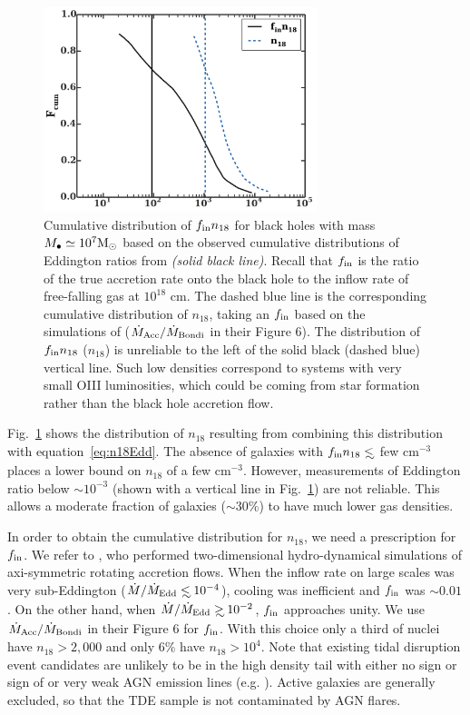 \documentclass[usenatbib,fleqn]{mnras}
\newcommand\lsim{\mathrel{\rlap{\lower4pt\hbox{\hskip1pt$\sim$}}
    \raise1pt\hbox{$<$}}}
\newcommand\gsim{\mathrel{\rlap{\lower4pt\hbox{\hskip1pt$\sim$}}
    \raise1pt\hbox{$>$}}}
\newcommand{\Mbh}[1][]{M_{\bullet#1}}
\newcommand{\Msun}{{\rm M_\odot}}
\begin{document}
\begin{figure}
\includegraphics[width=8cm]{fcum_n18.pdf}
\caption{\label{fig:n18Cum} Cumulative distribution of $f_{\rm in}
  n_{18}$ for black holes with mass $\Mbh\simeq 10^{7} \Msun$ based on
  the observed cumulative distributions of Eddington ratios from
  \citet{Kauffmann&Heckman2009} {\it (solid black line)}. Recall that
  $f_{\rm in}$ is the ratio of the true accretion rate onto the black
  hole to the inflow rate of free-falling gas at $10^{18}$ cm.  The
  dashed blue line is the corresponding cumulative distribution of
  $n_{18}$, taking an $f_{\rm in}$ based on the simulations of
  \citet{Li+2013} ($\dot{M}_{\rm Acc}/\dot{M}_{\rm Bondi}$ in their
  Figure 6). The distribution of $f_{\rm in} n_{18}$ ($n_{18}$) is
  unreliable to the left of the solid black (dashed blue) vertical
  line. Such low densities correspond to systems with very small OIII
  luminosities, which could be coming from star formation rather than
  the black hole accretion flow.}
\end{figure}


Fig.~\ref{fig:n18Cum} shows the distribution of $n_{18}$ resulting
from combining this distribution with equation~\eqref{eq:n18Edd}.  The
absence of galaxies with $f_{\rm in }n_{18} \lsim$ few cm$^{-3}$
places a lower bound on $n_{18}$ of a few cm$^{-3}$.  However,
measurements of Eddington ratio below $\sim 10^{-3}$ (shown with a
vertical line in Fig.~\ref{fig:n18Cum}) are not reliable. This allows a
moderate fraction of galaxies ($\sim 30\%$) to have much lower gas
densities.


In order to obtain the cumulative distribution for $n_{18}$, we need a
prescription for $f_{\rm in}$. We refer to \citet{Li+2013}, who
performed two-dimensional hydro-dynamical simulations of axi-symmetric
rotating accretion flows. When the inflow rate on large scales was
very sub-Eddington ($\dot{M}/\dot{M}_{\rm Edd} \lsim 10^{-4}$),
cooling was inefficient and $f_{\rm in}$ was $\sim 0.01$. On the other
hand, when $\dot{M}/\dot{M}_{\rm Edd}\gsim 10^{-2}$, $f_{\rm in}$
approaches unity.  We use $\dot{M}_{\rm Acc}/\dot{M}_{\rm Bondi}$ in
their Figure 6 for $f_{\rm in}$.  With this choice only a third of
nuclei have $n_{18}>2,000$ and only 6\% have $n_{18}>10^{4}$. Note
that existing tidal disruption event candidates are unlikely to be in
the high density tail with either no sign or sign of or very weak AGN
emission lines (e.g. \citealt{van-Velzen+2011, Arcavi+2014}). Active
galaxies are generally excluded, so that the TDE sample is not
contaminated by AGN flares.
\end{document}
